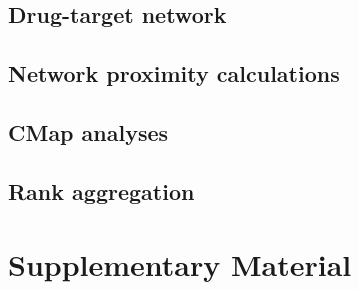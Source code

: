 \documentclass[letterpaper]{article}
\begin{document}
\subsection{Drug-target network}

\subsection{Network proximity calculations}

\subsection{CMap analyses}

\subsection{Rank aggregation}



\section*{Supplementary Material}

\setcounter{table}{0}
\makeatletter 
\renewcommand{\figurename}{Supplementary Table} %
\makeatother

\setcounter{figure}{0}
\makeatletter 
\renewcommand{\figurename}{Supplementary Figure} %
\makeatother
\end{document}
